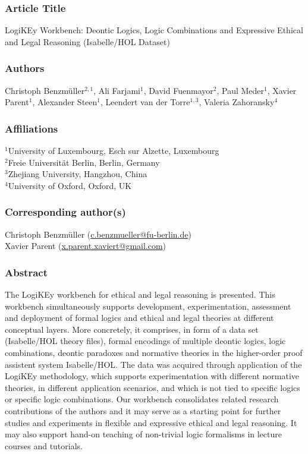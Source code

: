 \documentclass{article}
\newcommand{\comment}[1]{
}
\begin{document}
\subsubsection*{Article Title}
LogiKEy Workbench: Deontic Logics, Logic Combinations and Expressive
Ethical and Legal Reasoning (Isabelle/HOL Dataset)

\subsubsection*{Authors}
Christoph Benzm\"uller$^{2,1}$, Ali Farjami$^{1}$, David
Fuenmayor$^{2}$, Paul Meder$^{1}$, Xavier Parent$^{1}$, Alexander
Steen$^{1}$, Leendert van der Torre$^{1,3}$, Valeria Zahoransky$^{4}$

\subsubsection*{Affiliations}
$^{1}$University of Luxembourg, Esch sur Alzette, Luxembourg\\
$^{2}$Freie Universit\"at Berlin, Berlin, Germany \\
$^{3}$Zhejiang University, Hangzhou, China \\
$^{4}$University of Oxford, Oxford, UK\\

\subsubsection*{Corresponding author(s)}
Christoph Benzm\"uller (\url{c.benzmueller@fu-berlin.de}) \\
Xavier Parent (\url{x.parent.xaviert@gmail.com}) 

\comment{
[Firstname Lastname (email@address) – institutional email address preferred]
}


\subsubsection*{Abstract}
The LogiKEy workbench for 
ethical and legal reasoning is presented. This workbench
simultaneously supports development, experimentation, assessment and
deployment of formal logics and ethical and legal theories at
different conceptual layers. 
More concretely, it comprises, in form of a data set (Isabelle/HOL theory
files), formal encodings of multiple deontic logics, logic
combinations, deontic paradoxes and normative theories in the
higher-order proof assistent system Isabelle/HOL.  The data was
acquired through application of the LogiKEy methodology, which
supports experimentation with different normative theories, in
different application scenarios, and which is not tied to specific
logics or specific logic combinations.  Our workbench consolidates
related research contributions of the authors and it may serve as a
starting point for further studies and experiments in flexible and
expressive ethical and legal reasoning. It may also support hand-on
teaching of non-trivial logic formalisms in lecture courses and
tutorials.
\end{document}
